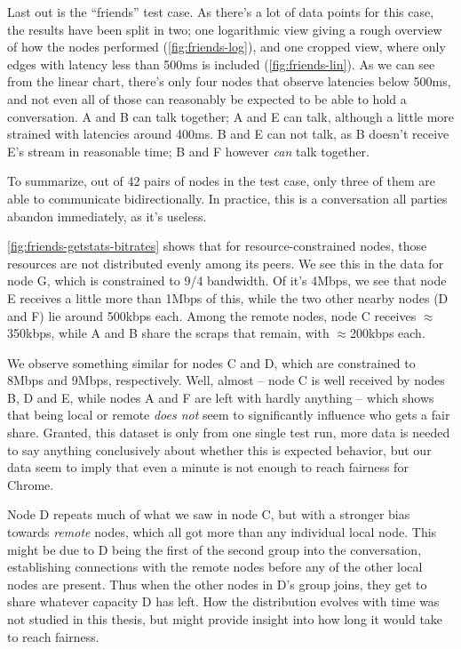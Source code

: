 Last out is the ``friends'' test case. As there's a lot of data points for this case, the results have been split in two; one logarithmic view giving a rough overview of how the nodes performed (\autoref{fig:friends-log}), and one cropped view, where only edges with latency less than 500ms is included (\autoref{fig:friends-lin}). As we can see from the linear chart, there's only four nodes that observe latencies below 500ms, and not even all of those can reasonably be expected to be able to hold a conversation. A and B can talk together; A and E can talk, although a little more strained with latencies around 400ms. B and E can not talk, as B doesn't receive E's stream in reasonable time; B and F however \emph{can} talk together.

To summarize, out of 42 pairs of nodes in the test case, only three of them are able to communicate bidirectionally. In practice, this is a conversation all parties abandon immediately, as it's useless.

\autoref{fig:friends-getstats-bitrates} shows that for resource-constrained nodes, those resources are not distributed evenly among its peers. We see this in the data for node G, which is constrained to 9/4 bandwidth. Of it's 4Mbps, we see that node E receives a little more than 1Mbps of this, while the two other nearby nodes (D and F) lie around 500kbps each. Among the remote nodes, node C receives $\approx$350kbps, while A and B share the scraps that remain, with $\approx$200kbps each.

We observe something similar for nodes C and D, which are constrained to 8Mbps and 9Mbps, respectively. Well, almost -- node C is well received by nodes B, D and E, while nodes A and F are left with hardly anything -- which shows that being local or remote \emph{does not} seem to significantly influence who gets a fair share. Granted, this dataset is only from one single test run, more data is needed to say anything conclusively about whether this is expected behavior, but our data seem to imply that even a minute is not enough to reach fairness for Chrome.

Node D repeats much of what we saw in node C, but with a stronger bias towards \emph{remote} nodes, which all got more than any individual local node. This might be due to D being the first of the second group into the conversation, establishing connections with the remote nodes before any of the other local nodes are present. Thus when the other nodes in D's group joins, they get to share whatever capacity D has left. How the distribution evolves with time was not studied in this thesis, but might provide insight into how long it would take to reach fairness.

